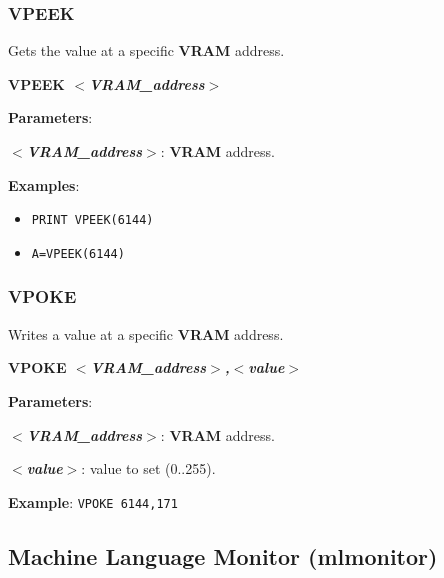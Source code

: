         \subsubsection{{VPEEK}}
        Gets the value at a specific \textbf{VRAM} address.

        \hspace{1.9cm}\textbf{VPEEK \textit{$<$VRAM\_address$>$}}

        \textbf{Parameters}:

        \hspace{1cm}\textbf{\textit{$<$VRAM\_address$>$}}: \textbf{VRAM} address.

        \textbf{Examples}:
        \begin{itemize}
            \item \texttt{PRINT VPEEK(6144)}
            \item \texttt{A=VPEEK(6144)}
        \end{itemize}

        \subsubsection{{VPOKE}}
        Writes a value at a specific \textbf{VRAM} address.

        \hspace{1.9cm}\textbf{VPOKE \textit{$<$VRAM\_address$>$,$<$value$>$}}

        \textbf{Parameters}:

        \hspace{1cm}\textbf{\textit{$<$VRAM\_address$>$}}: \textbf{VRAM} address.

        \hspace{1cm}\textbf{\textit{$<$value$>$}}: value to set (0..255).

        \textbf{Example}: \texttt{VPOKE 6144,171}

    \subsection{Machine Language Monitor (mlmonitor)}
    \label{software:mlmonitor}

